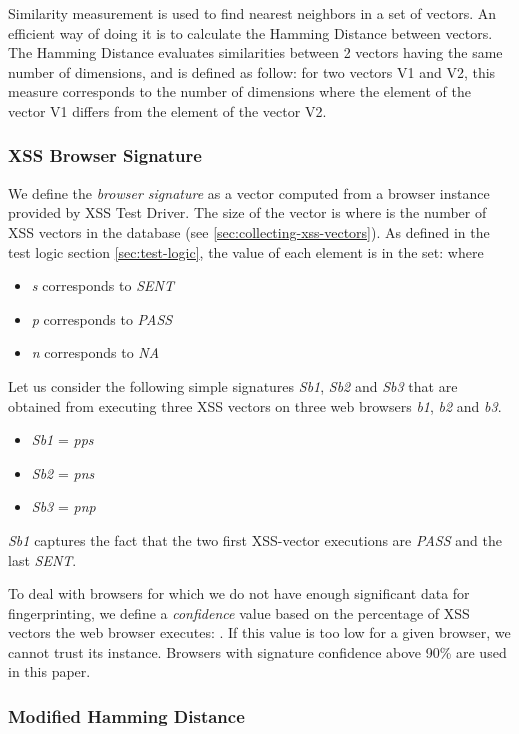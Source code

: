 \documentclass[10pt]{IEEEtran}
\begin{document}
Similarity measurement is used to find nearest neighbors in a set of vectors.
An efficient way of doing it is to calculate the Hamming Distance between vectors. 
The Hamming Distance evaluates similarities between 2 vectors having the same number of dimensions, and is defined as follow:
for two vectors V1 and V2, this measure corresponds to the number of dimensions where the element of the vector V1 differs from the element of the vector V2.


\subsubsection{XSS Browser Signature}


We define the \emph{browser signature} as a vector computed from a browser instance
provided by XSS Test Driver.
The size of the vector is   where  is the number of XSS vectors in the database 
(see \ref{sec:collecting-xss-vectors}).
As defined in the test logic section \ref{sec:test-logic}, the value of each element is in the set:  where
\begin{itemize}
\item \emph{s} corresponds to \emph{SENT}
\item \emph{p} corresponds to \emph{PASS}
\item \emph{n} corresponds to \emph{NA}
\end{itemize}


Let us consider the following simple signatures \emph{Sb1}, \emph{Sb2} and \emph{Sb3} that are obtained from executing three XSS vectors on three web browsers \emph{b1}, \emph{b2} and \emph{b3}.
\begin{itemize}
\item \emph{Sb1} = \emph{pps}
\item \emph{Sb2} = \emph{pns}
\item \emph{Sb3} = \emph{pnp}
\end{itemize}

\emph{Sb1} captures the fact that the two first XSS-vector executions are \emph{PASS} and the last  \emph{SENT}.


To deal with browsers for which we do not have enough significant data for fingerprinting, 
we define a \emph{confidence} value based on the percentage of XSS vectors the web browser executes: . 
If this value is too 
low for a given browser, we cannot trust its instance. Browsers with signature 
confidence above 90\% are used in this paper. 


\subsubsection{Modified Hamming Distance}
\end{document}
